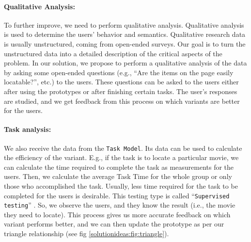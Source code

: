 \paragraph{Qualitative Analysis:}
\label{solutionideas:paragraph:qualitative}
To further improve, we need to perform qualitative analysis.
Qualitative analysis is used to determine the users' behavior and semantics.
Qualitative research data is usually unstructured, coming from open-ended surveys. 
Our goal is to turn the unstructured data into a detailed description of the critical aspects of the problem.
In our solution, we propose to perform a qualitative analysis of the data by asking some open-ended questions (e.g., ``Are the items on the page easily locatable?'', etc.) to the users.
These questions can be asked to the users either after using the prototypes or after finishing certain tasks. 
The user's responses are studied, and we get feedback from this process on which variants are better for the users. 

\paragraph{Task analysis:}
\label{solutionideas:paragraph:taskanalysis}
We also receive the data from the \texttt{Task Model}. 
Its data can be used to calculate the efficiency of the variant. 
E.g., if the task is to locate a particular movie, we can calculate the time required to complete the task as measurements for the users.
Then, we calculate the average Task Time for the whole group or only those who accomplished the task.
Usually, less time required for the task to be completed for the users is desirable.
This testing type is called ``\texttt{Supervised testing}'' \cite{article:dataanalysis:supervisedtest}.
So, we observe the users, and they know the result (i.e., the movie they need to locate). 
This process gives us more accurate feedback on which variant performs better, and we can then update the prototype as per our triangle relationship (see fig \ref{solutionideas:fig:triangle}).

